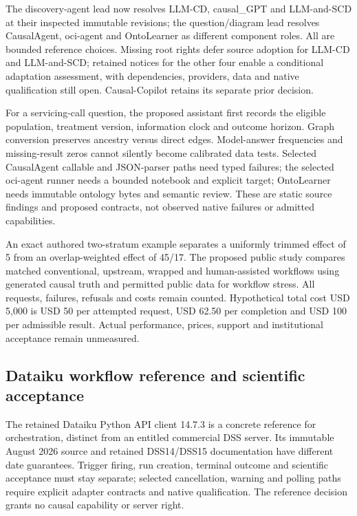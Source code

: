 The discovery-agent lead now resolves LLM-CD, causal\_GPT and
LLM-and-SCD at their inspected immutable revisions; the question/diagram
lead resolves CausalAgent, oci-agent and OntoLearner as different
component roles. All are bounded reference choices. Missing root rights
defer source adoption for LLM-CD and LLM-and-SCD; retained notices for
the other four enable a conditional adaptation assessment, with
dependencies, providers, data and native qualification still open.
Causal-Copilot retains its separate prior
decision.\citep{exec14_iid_cd,exec14_iid_gpt,exec14_iid_scd,exec13_data_causalagent_code,exec13_data_oci_code,exec13_data_ontolearner_code,exec25_agents_choice}

For a servicing-call question, the proposed assistant first records the
eligible population, treatment version, information clock and outcome
horizon. Graph conversion preserves ancestry versus direct edges.
Model-answer frequencies and missing-result zeros cannot silently become
calibrated data tests. Selected CausalAgent callable and JSON-parser
paths need typed failures; the selected oci-agent runner needs a bounded
notebook and explicit target; OntoLearner needs immutable ontology bytes
and semantic review. These are static source findings and proposed
contracts, not observed native failures or admitted
capabilities.\citep{exec14_iid_cd,exec14_iid_gpt,exec14_iid_scd,exec13_data_causalagent_code,exec13_data_oci_code,exec13_data_ontolearner_code,exec25_agents_choice}

An exact authored two-stratum example separates a uniformly trimmed
effect of 5 from an overlap-weighted effect of 45/17. The proposed
public study compares matched conventional, upstream, wrapped and
human-assisted workflows using generated causal truth and permitted
public data for workflow stress. All requests, failures, refusals and
costs remain counted. Hypothetical total cost USD 5,000 is USD 50 per
attempted request, USD 62.50 per completion and USD 100 per admissible
result. Actual performance, prices, support and institutional acceptance
remain unmeasured.\citep{exec25_agents_choice}

\hypertarget{dataiku-workflow-reference-and-scientific-acceptance}{%
\subsection{Dataiku workflow reference and scientific
acceptance}\label{dataiku-workflow-reference-and-scientific-acceptance}}

The retained Dataiku Python API client 14.7.3 is a concrete reference
for orchestration, distinct from an entitled commercial DSS server. Its
immutable August 2026 source and retained DSS14/DSS15 documentation have
different date guarantees. Trigger firing, run creation, terminal
outcome and scientific acceptance must stay separate; selected
cancellation, warning and polling paths require explicit adapter
contracts and native qualification. The reference decision grants no
causal capability or server
right.\citep{exec24_workflow_contracts_dataiku,exec23_dss_dss14_flow,exec23_dss_dss14_releases,exec23_dss_latest_flow,exec23_dss_latest_releases,exec25_dataiku_choice}


